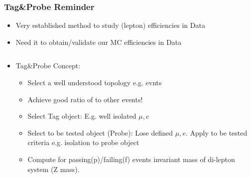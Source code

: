 \documentclass{beamer}
\begin{document}
\begin{frame}
 \frametitle{Tag\&Probe Reminder}
 \begin{itemize}
  \item Very established method to study (lepton) efficiencies in Data
  \item Need it to obtain/validate our MC efficiencies in Data
  \end{itemize}
  
  \begin{columns}
 \begin{column}{0.50\textwidth}
 
   \begin{itemize}

  \item Tag\&Probe Concept:
  \begin{itemize}
   \item Select a well understood topology e.g. \Zll evnts
   \item Achieve good ratio of \Zll to other events!
   \item Select Tag object: E.g. well isolated $\mu,e$
   \item Select to be tested object (Probe): Lose defined $\mu,e$. Apply to be tested criteria e.g. isolation to probe object
   \item Compute for passing(p)/failing(f) events invariant mass of di-lepton system (Z mass). 
  \end{itemize}


\end{itemize}
\end{column}
\end{columns}
\end{frame}
\end{document}
